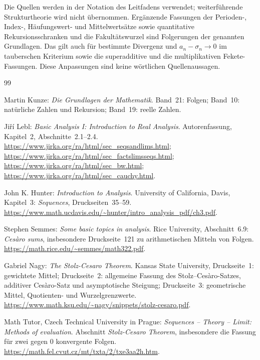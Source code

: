 Die Quellen werden in der Notation des Leitfadens verwendet;
weiterführende Strukturtheorie wird nicht übernommen.
Ergänzende Fassungen der Perioden-, Index-, Häufungswert- und
Mittelwertsätze sowie quantitative Rekursionsschranken und die
Fakultätswurzel sind Folgerungen der genannten Grundlagen.
Das gilt auch für bestimmte Divergenz und $a_n-\sigma_n\to0$
im tauberschen Kriterium sowie die superadditive und die
multiplikativen Fekete-Fassungen.
Diese Anpassungen sind keine wörtlichen Quellenaussagen.

\renewcommand{\bibname}{Literatur}
\begin{thebibliography}{99}
\small
\setlength{\itemsep}{3pt}
\setlength{\parskip}{0pt}

Martin Kunze: \emph{Die Grundlagen der Mathematik}.
Band~21: Folgen; Band~10: natürliche Zahlen und Rekursion;
Band~19: reelle Zahlen.

Jiří Lebl: \emph{Basic Analysis I: Introduction to Real Analysis}.
Autorenfassung, Kapitel~2, Abschnitte~2.1--2.4.
\url{https://www.jirka.org/ra/html/sec_seqsandlims.html};
\url{https://www.jirka.org/ra/html/sec_factslimsseqs.html};
\url{https://www.jirka.org/ra/html/sec_bw.html};
\url{https://www.jirka.org/ra/html/sec_cauchy.html}.

John K. Hunter: \emph{Introduction to Analysis}.
University of California, Davis, Kapitel~3: \emph{Sequences},
Druckseiten~35--59.
\url{https://www.math.ucdavis.edu/~hunter/intro_analysis_pdf/ch3.pdf}.

Stephen Semmes: \emph{Some basic topics in analysis}.
Rice University, Abschnitt~6.9: \emph{Cesàro sums},
insbesondere Druckseite~121 zu arithmetischen Mitteln von Folgen.
\url{https://math.rice.edu/~semmes/math322.pdf}.

Gabriel Nagy: \emph{The Stolz-Cesaro Theorem}.
Kansas State University, Druckseite~1: gewichtete Mittel;
Druckseite~2: allgemeine Fassung
des Stolz--Cesàro-Satzes, additiver Cesàro-Satz und
asymptotische Steigung; Druckseite~3: geometrische Mittel,
Quotienten- und Wurzelgrenzwerte.
\url{https://www.math.ksu.edu/~nagy/snippets/stolz-cesaro.pdf}.

Math Tutor, Czech Technical University in Prague:
\emph{Sequences -- Theory -- Limit: Methods of evaluation}.
Abschnitt \emph{Stolz-Cesaro Theorem}, insbesondere die
Fassung für zwei gegen $0$ konvergente Folgen.
\url{https://math.fel.cvut.cz/mt/txta/2/txe3aa2h.htm}.



\end{thebibliography}
